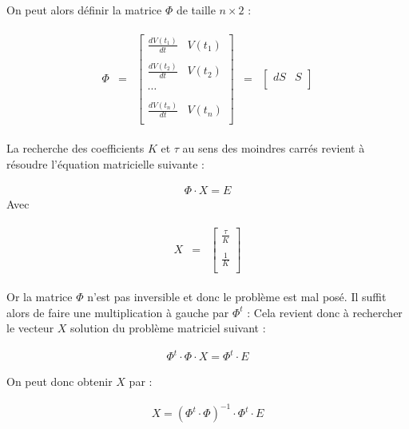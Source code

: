 \begin{prop}
On peut alors définir la matrice $\Phi$ de taille $n\times 2$ : 

\begin{align*}
\begin{array}{ccccc}
\Phi&=&
\left[
\begin{array}{cc}
\frac{dV(t_1)}{dt} & V(t_1) \\
\\
\frac{dV(t_2)}{dt} & V(t_2)\\
\\
\cdots\\
\\
\frac{dV(t_n)}{dt}& V(t_n) \\
\end{array}
\right]
&=&
\left[
\begin{array}{cc}
dS & S\\
\end{array}
\right]
\end{array}
\end{align*}

La recherche des coefficients $K$ et $\tau$ au sens des moindres carrés revient à résoudre l'équation matricielle suivante : 

\begin{align*}
\Phi\cdot X=E
\end{align*}
Avec 

\begin{align*}
\begin{array}{ccc}
X&=&
\left[
\begin{array}{c}
\frac{\tau}{K}\\
\\
\frac{1}{K}\\
\end{array}
\right]
\end{array}
\end{align*}

Or la matrice $\Phi$ n'est pas inversible et donc le problème est mal posé. Il suffit alors de faire une multiplication à gauche par $\Phi^t$ : 
Cela revient donc à rechercher le vecteur $X$ solution du problème matriciel suivant : 


\begin{align*}
\Phi^t\cdot \Phi\cdot X=\Phi^t\cdot E
\end{align*}

On peut donc obtenir $X$ par : 

\begin{align*}
X=\left(\Phi^t\cdot \Phi\right)^{-1}\cdot \Phi^t\cdot E
\end{align*}

\end{prop}

